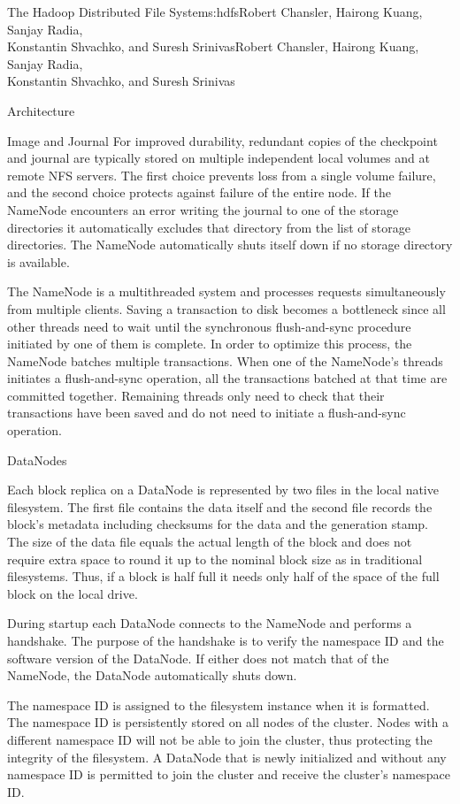 \begin{aosachaptertoc}{The Hadoop Distributed File System}{s:hdfs}{Robert Chansler, Hairong Kuang, Sanjay Radia, \\ Konstantin Shvachko, and Suresh Srinivas}{Robert Chansler, Hairong Kuang, Sanjay Radia, \\ \hspace*{0.9cm} Konstantin Shvachko, and Suresh Srinivas}
\begin{aosasect1}{Architecture}
\begin{aosasect2}{Image and Journal}
For improved durability, redundant copies of the checkpoint and
journal are typically stored on multiple independent local volumes and
at remote NFS servers. The first choice prevents loss from a single
volume failure, and the second choice protects against failure of the
entire node. If the NameNode encounters an error writing the journal
to one of the storage directories it automatically excludes that
directory from the list of storage directories. The NameNode
automatically shuts itself down if no storage directory is available.

The NameNode is a multithreaded system and processes requests
simultaneously from multiple clients. Saving a transaction to disk
becomes a bottleneck since all other threads need to wait until the
synchronous flush-and-sync procedure initiated by one of them is
complete.  In order to optimize this process, the NameNode batches
multiple transactions. When one of the NameNode's threads initiates a
flush-and-sync operation, all the transactions batched at that time
are committed together. Remaining threads only need to check that
their transactions have been saved and do not need to initiate a
flush-and-sync operation.

\end{aosasect2}

\begin{aosasect2}{DataNodes}

Each block replica on a DataNode is represented by two files in the
local native filesystem. The first file contains the data itself and
the second file records the block's metadata including checksums for
the data and the generation stamp. The size of the data file equals
the actual length of the block and does not require extra space to
round it up to the nominal block size as in traditional
filesystems. Thus, if a block is half full it needs only half of the
space of the full block on the local drive.

During startup each DataNode connects to the NameNode and performs a
handshake. The purpose of the handshake is to verify the namespace ID
and the software version of the DataNode. If either does not match
that of the NameNode, the DataNode automatically shuts down.

The namespace ID is assigned to the filesystem instance when it is
formatted. The namespace ID is persistently stored on all nodes of the
cluster. Nodes with a different namespace ID will not be able to join
the cluster, thus protecting the integrity of the filesystem. A
DataNode that is newly initialized and without any namespace ID is
permitted to join the cluster and receive the cluster's namespace ID.


\end{aosasect2}
\end{aosasect1}
\end{aosachaptertoc}
